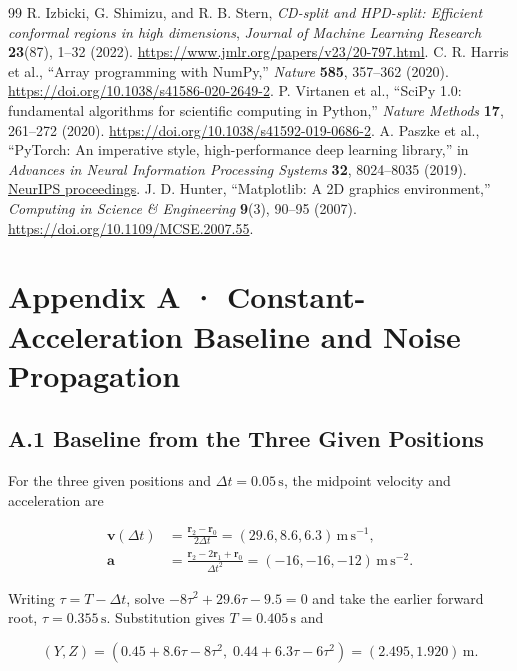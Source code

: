 \begin{thebibliography}{99}
 R. Izbicki, G. Shimizu, and R. B. Stern, \emph{CD-split and HPD-split: Efficient conformal regions in high dimensions}, \emph{Journal of Machine Learning Research} \textbf{23}(87), 1--32 (2022). \url{https://www.jmlr.org/papers/v23/20-797.html}.
 C. R. Harris et al., “Array programming with NumPy,” \emph{Nature} \textbf{585}, 357--362 (2020). \url{https://doi.org/10.1038/s41586-020-2649-2}.
 P. Virtanen et al., “SciPy 1.0: fundamental algorithms for scientific computing in Python,” \emph{Nature Methods} \textbf{17}, 261--272 (2020). \url{https://doi.org/10.1038/s41592-019-0686-2}.
 A. Paszke et al., “PyTorch: An imperative style, high-performance deep learning library,” in \emph{Advances in Neural Information Processing Systems} \textbf{32}, 8024--8035 (2019). \href{https://proceedings.neurips.cc/paper_files/paper/2019/hash/bdbca288fee7f92f2bfa9f7012727740-Abstract.html}{NeurIPS proceedings}.
 J. D. Hunter, “Matplotlib: A 2D graphics environment,” \emph{Computing in Science \& Engineering} \textbf{9}(3), 90--95 (2007). \url{https://doi.org/10.1109/MCSE.2007.55}.
\end{thebibliography}

\section*{Appendix A · Constant-Acceleration Baseline and Noise Propagation}

\subsection*{A.1 Baseline from the Three Given Positions}

For the three given positions and $\Delta t=0.05\,\mathrm{s}$, the midpoint velocity and acceleration are

$$
\begin{aligned}
\mathbf v(\Delta t)&=\frac{\mathbf r_2-\mathbf r_0}{2\Delta t}=(29.6,8.6,6.3)\,\mathrm{m\,s^{-1}},\\
  \mathbf a&=\frac{\mathbf r_2-2\mathbf r_1+\mathbf r_0}{\Delta t^2}=(-16,-16,-12)\,\mathrm{m\,s^{-2}}.
\end{aligned}
$$

Writing $\tau=T-\Delta t$, solve $-8\tau^2+29.6\tau-9.5=0$ and take the earlier forward root, $\tau=0.355\,\mathrm{s}$. Substitution gives $T=0.405\,\mathrm{s}$ and

$$
(Y,Z)=(0.45+8.6\tau-8\tau^2,\;0.44+6.3\tau-6\tau^2)=(2.495,1.920)\,\mathrm{m}.
$$


